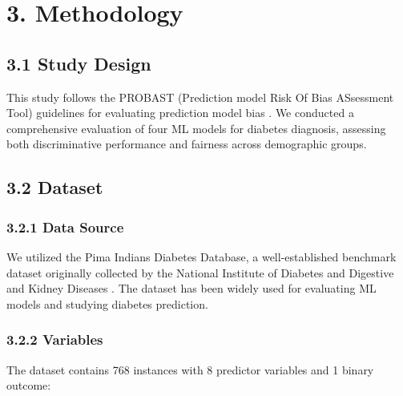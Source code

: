 \documentclass[12pt,a4paper]{article}
\begin{document}
\section{3. Methodology}

\subsection{3.1 Study Design}

This study follows the PROBAST (Prediction model Risk Of Bias ASsessment 
Tool) guidelines for evaluating prediction model bias \cite{wolff2019}. 
We conducted a comprehensive evaluation of four ML models for diabetes 
diagnosis, assessing both discriminative performance and fairness across 
demographic groups.

\subsection{3.2 Dataset}

\subsubsection{3.2.1 Data Source}

We utilized the Pima Indians Diabetes Database, a well-established benchmark 
dataset originally collected by the National Institute of Diabetes and 
Digestive and Kidney Diseases \cite{smith1988}. The dataset has been widely 
used for evaluating ML models and studying diabetes prediction.

\subsubsection{3.2.2 Variables}

The dataset contains 768 instances with 8 predictor variables and 1 binary 
outcome:
\end{document}
